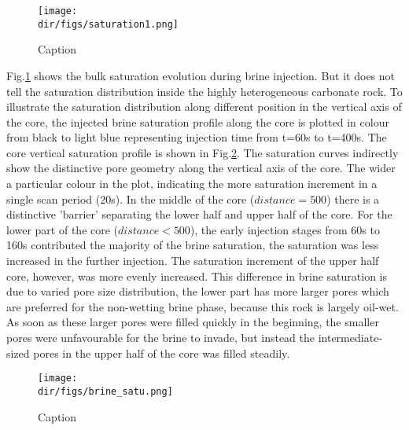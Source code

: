 \begin{figure}
    \centering
    \texttt{[image: \\dir/figs/saturation1.png]}
    \caption{Caption}
    \label{satu1}
\end{figure}

Fig.\ref{satu1} shows the bulk saturation evolution during brine injection. But it does not tell the saturation distribution inside the highly heterogeneous carbonate rock. To illustrate the saturation distribution along different position in the vertical axis of the core, the injected brine saturation profile along the core is plotted in colour from black to light blue representing injection time from t=60s to t=400s. The core vertical saturation profile is shown in Fig.\ref{brinesatu}. The saturation curves indirectly show the distinctive pore geometry along the vertical axis of the core. The wider a particular colour in the plot, indicating the more saturation increment in a single scan period (20s). In the middle of the core ($distance = 500$) there is a distinctive 'barrier' separating the lower half and upper half of the core. For the lower part of the core ($distance < 500$), the early injection stages from 60s to 160s contributed the majority of the brine saturation, the saturation was less increased in the further injection. The saturation increment of the upper half core, however, was more evenly increased. This difference in brine saturation is due to varied pore size distribution, the lower part has more larger pores which are preferred for the non-wetting brine phase, because this rock is largely oil-wet. As soon as these larger pores were filled quickly in the beginning, the smaller pores were unfavourable for the brine to invade, but instead the intermediate-sized pores in the upper half of the core was filled steadily.

\begin{figure}
    \centering
    \texttt{[image: \\dir/figs/brine\_satu.png]}
    \caption{Caption}
    \label{brinesatu}
\end{figure}

